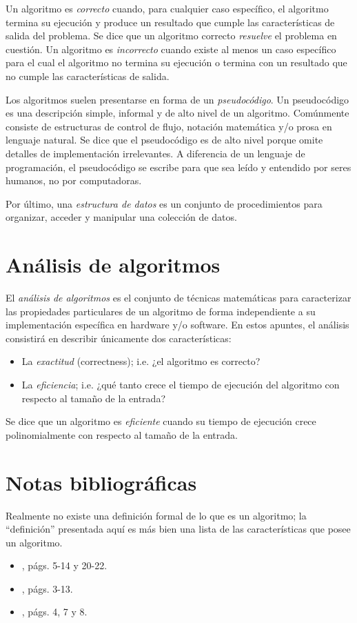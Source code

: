 Un algoritmo es \emph{correcto} cuando, para cualquier caso específico,
el algoritmo termina su ejecución y produce un resultado que cumple
las características de salida del problema. Se dice que un algoritmo
correcto \emph{resuelve} el problema en cuestión. Un algoritmo es
\emph{incorrecto} cuando existe al menos un caso específico para el
cual el algoritmo no termina su ejecución o termina con un resultado
que no cumple las características de salida. 

Los algoritmos suelen presentarse en forma de un \emph{pseudocódigo}.
Un pseudocódigo es una descripción simple, informal y de alto nivel
de un algoritmo. Comúnmente consiste de estructuras de control de
flujo, notación matemática y/o prosa en lenguaje natural. Se dice
que el pseudocódigo es de alto nivel porque omite detalles de implementación
irrelevantes. A diferencia de un lenguaje de programación, el pseudocódigo
se escribe para que sea leído y entendido por seres humanos, no por
computadoras.

Por último, una \emph{estructura de datos} es un conjunto de procedimientos
para organizar, acceder y manipular una colección de datos.

\section{Análisis de algoritmos}

El \emph{análisis de algoritmos} es el conjunto de técnicas matemáticas
para caracterizar las propiedades particulares de un algoritmo de
forma independiente a su implementación específica en hardware y/o
software. En estos apuntes, el análisis consistirá en describir únicamente
dos características:

\begin{itemize}
    \item La\emph{ exactitud} (correctness); i.e. ¿el algoritmo es correcto?
    \item La\emph{ eficiencia}; i.e. ¿qué tanto crece el tiempo de ejecución
    del algoritmo con respecto al tamaño de la entrada?
\end{itemize}

Se dice que un algoritmo es \emph{eficiente} cuando su tiempo de ejecución
crece polinomialmente con respecto al tamaño de la entrada.

\section*{Notas bibliográficas}

Realmente no existe una definición formal de lo que es un algoritmo;
la ``definición'' presentada aquí es más bien una lista de las características
que posee un algoritmo.

\begin{itemize}
    \item \textcite{cormen_introduction_2009}, págs. 5-14 y 20-22.
    \item \textcite{skiena_algorithm_2011}, págs. 3-13.
    \item \textcite{goodrich_algorithm_2001}, págs. 4, 7 y 8.
\end{itemize}
